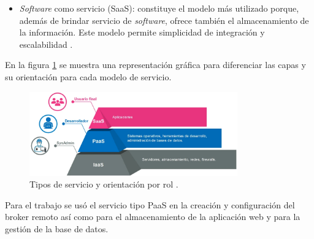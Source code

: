 \begin{itemize}
\item \emph{Software} como servicio (SaaS): constituye el modelo más utilizado porque, además de brindar servicio de \emph{software}, ofrece también el almacenamiento de la información. Este modelo permite simplicidad de integración y escalabilidad \citep{BOOK:2}. 




\end{itemize}

En la figura \ref{fig:servicios} se muestra una representación gráfica para diferenciar las capas y su orientación para cada modelo de servicio.




\begin{figure}[htbp]
	\centering
	\includegraphics[width=0.8\textwidth]{./Figures/servicios.png}
	\caption{Tipos de servicio y orientación por rol \protect\footnotemark.}

	\label{fig:servicios}
\end{figure}



Para el trabajo se usó el servicio tipo PaaS en la creación y configuración del broker remoto así como para el almacenamiento de la aplicación web y para la gestión de la base de datos.



